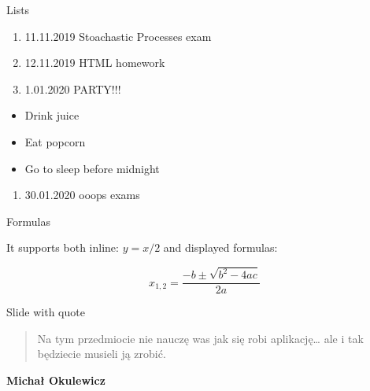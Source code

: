 \documentclass[ignorenonframetext,]{beamer}
\providecommand{\tightlist}{%
  \setlength{\itemsep}{0pt}\setlength{\parskip}{0pt}}
\begin{document}
\begin{frame}{Lists}

\begin{enumerate}
\def\labelenumi{\arabic{enumi}.}
\tightlist
\item
  11.11.2019 Stoachastic Processes exam
\item
  12.11.2019 HTML homework
\item
  1.01.2020 PARTY!!!
\end{enumerate}

\begin{itemize}
\tightlist
\item
  Drink juice
\item
  Eat popcorn
\item
  Go to sleep before midnight
\end{itemize}

\begin{enumerate}
\def\labelenumi{\arabic{enumi}.}
\tightlist
\item
  30.01.2020 ooops exams
\end{enumerate}

\end{frame}

\begin{frame}{Formulas}

It supports both inline: \(y = x / 2\) and displayed formulas:

\[ x_{1,2} = \frac{- b \pm \sqrt{b^2 - 4ac}}{2a} \]

\end{frame}

\begin{frame}{Slide with quote}

\begin{quote}
Na tym przedmiocie nie nauczę was jak się robi aplikację\ldots{} ale i
tak będziecie musieli ją zrobić.
\end{quote}

\textbf{Michał Okulewicz}

\end{frame}
\end{document}
